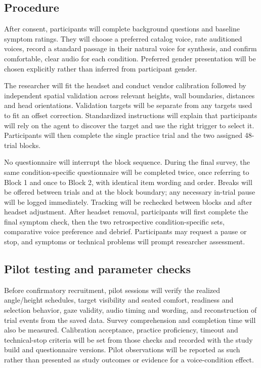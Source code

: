 \documentclass[11pt,letterpaper]{article}
\begin{document}
\subsection{Procedure}
After consent, participants will complete background questions and baseline symptom ratings. They will choose a preferred catalog voice, rate auditioned voices, record a standard passage in their natural voice for synthesis, and confirm comfortable, clear audio for each condition. Preferred gender presentation will be chosen explicitly rather than inferred from participant gender.

The researcher will fit the headset and conduct vendor calibration followed by independent spatial validation across relevant heights, wall boundaries, distances and head orientations. Validation targets will be separate from any targets used to fit an offset correction. Standardized instructions will explain that participants will rely on the agent to discover the target and use the right trigger to select it. Participants will then complete the single practice trial and the two assigned 48-trial blocks.

No questionnaire will interrupt the block sequence. During the final survey, the same condition-specific questionnaire will be completed twice, once referring to Block 1 and once to Block 2, with identical item wording and order. Breaks will be offered between trials and at the block boundary; any necessary in-trial pause will be logged immediately. Tracking will be rechecked between blocks and after headset adjustment. After headset removal, participants will first complete the final symptom check, then the two retrospective condition-specific sets, comparative voice preference and debrief. Participants may request a pause or stop, and symptoms or technical problems will prompt researcher assessment.

\subsection{Pilot testing and parameter checks}
Before confirmatory recruitment, pilot sessions will verify the realized angle/height schedules, target visibility and seated comfort, readiness and selection behavior, gaze validity, audio timing and wording, and reconstruction of trial events from the saved data. Survey comprehension and completion time will also be measured. Calibration acceptance, practice proficiency, timeout and technical-stop criteria will be set from those checks and recorded with the study build and questionnaire versions. Pilot observations will be reported as such rather than presented as study outcomes or evidence for a voice-condition effect.
\end{document}
